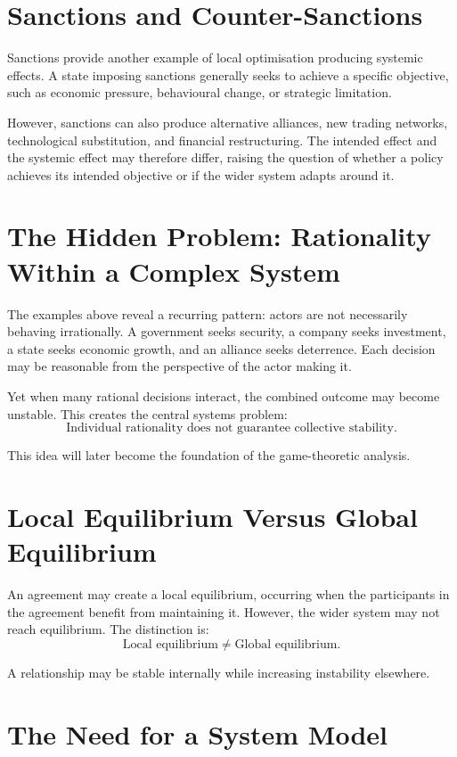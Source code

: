 \documentclass[11pt,openany]{book}
\theoremstyle{plain}
\theoremstyle{definition}
\begin{document}
\section*{Sanctions and Counter-Sanctions}

Sanctions provide another example of local optimisation producing systemic effects. A state imposing sanctions generally seeks to achieve a specific objective, such as economic pressure, behavioural change, or strategic limitation. 

However, sanctions can also produce alternative alliances, new trading networks, technological substitution, and financial restructuring. The intended effect and the systemic effect may therefore differ, raising the question of whether a policy achieves its intended objective or if the wider system adapts around it.

\section*{The Hidden Problem: Rationality Within a Complex System}

The examples above reveal a recurring pattern: actors are not necessarily behaving irrationally. A government seeks security, a company seeks investment, a state seeks economic growth, and an alliance seeks deterrence. Each decision may be reasonable from the perspective of the actor making it.

Yet when many rational decisions interact, the combined outcome may become unstable. This creates the central systems problem:
\[
\boxed{
\text{Individual rationality does not guarantee collective stability.}
}
\]

This idea will later become the foundation of the game-theoretic analysis.

\section*{Local Equilibrium Versus Global Equilibrium}

An agreement may create a local equilibrium, occurring when the participants in the agreement benefit from maintaining it. However, the wider system may not reach equilibrium. The distinction is:
\[
\text{Local equilibrium}
\neq
\text{Global equilibrium}.
\]

A relationship may be stable internally while increasing instability elsewhere.

\section*{The Need for a System Model}
\end{document}
